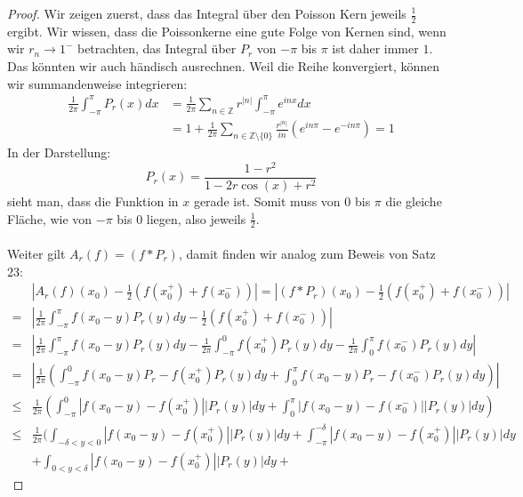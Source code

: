 \documentclass[11pt]{article}
\newcommand{\Z}{\mathbb{Z}}
\begin{document}
    \begin{proof}
        Wir zeigen zuerst, dass das Integral über den Poisson Kern jeweils $\frac{1}{2}$ ergibt.
        Wir wissen, dass die Poissonkerne eine gute Folge von Kernen sind, wenn wir $r_n\to 1^-$
        betrachten, das Integral über $P_r$ von $-\pi$ bis $\pi$ ist daher immer $1$. Das könnten wir
        auch händisch ausrechnen. Weil
        die Reihe konvergiert, können wir summandenweise integrieren:
        $$\begin{aligned}
              \frac{1}{2\pi}\int_{-\pi}^\pi P_r(x) d x &=
              \frac{1}{2\pi}\sum_{n\in\Z}r^{|n|}\int_{-\pi}^{\pi}e^{inx}dx \\
              &= 1 + \frac{1}{2\pi}\sum_{n\in\Z\setminus\{0\}}\frac{r^{|n|}}{in}(e^{in\pi}-e^{-in\pi})=1
        \end{aligned}$$
        In der Darstellung:
        $$P_r(x)=\frac{1-r^2}{1-2r\cos(x)+r^2}$$
        sieht man, dass die Funktion in $x$ gerade ist. Somit muss von $0$ bis $\pi$ die gleiche Fläche,
        wie von $-\pi$ bis $0$ liegen, also jeweils $\frac{1}{2}$.
        \\\\
        Weiter gilt $A_r(f)= (f*P_r)$, damit finden wir analog zum Beweis von Satz 23:
        $$\begin{aligned}
              &\left|A_r(f)(x_0)-\frac{1}{2}(f(x_0^{+})+f(x_0^{-}))\right| =
              \left|(f*P_r)(x_0)-\frac{1}{2}(f(x_0^{+})+f(x_0^{-}))\right|\\
              = &\left|\frac{1}{2\pi}\int_{-\pi}^{\pi}f(x_0-y)P_r(y)dy-\frac{1}{2}(f(x_0^{+})+f(x_0^{-}))\right|\\
              = &\left|\frac{1}{2\pi}\int_{-\pi}^{\pi}f(x_0-y)P_r(y)dy-
              \frac{1}{2 \pi} \int_{-\pi}^0 f(x_0^{+})P_r(y) d y-\frac{1}{2 \pi} \int_{0}^{\pi} f(x_0^{-})P_r(y) d y\right|\\
              =&\left|\frac{1}{2\pi}\left(\int_{-\pi}^{0}f(x_0-y)P_{r}-f(x_0^{+})P_r(y)dy+
              \int_{0}^{\pi}f(x_0-y)P_{r}-f(x_0^{-})P_r(y)dy\right)\right|\\
              \leq &\frac{1}{2\pi}\left(\int_{-\pi}^{0}|f(x_0-y)-f(x_0^{+})||P_r(y)|dy+
              \int_{0}^{\pi}|f(x_0-y)-f(x_0^{-})||P_r(y)|dy\right)\\
              \leq & \frac{1}{2\pi}\bigg(\int_{-\delta<y<0}|f(x_0-y)-f(x_0^{+})||P_r(y)|dy+
              \int_{-\pi}^{-\delta}|f(x_0-y)-f(x_0^{+})||P_r(y)|dy \\&+ \int_{0<y<\delta}|f(x_0-y)-f(x_0^{+})||P_r(y)|dy +

\end{aligned}$$
\end{proof}
\end{document}
